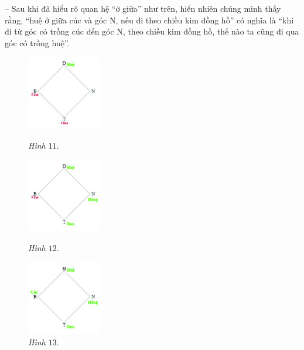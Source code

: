 	-- Sau khi đã hiểu rõ quan hệ “ở giữa” như trên, hiển nhiên chúng mình thấy rằng, “huệ ở giữa cúc và góc N, nếu đi theo chiều kim đồng hồ” có nghĩa là “khi đi từ góc có trồng cúc đến góc N, theo chiều kim đồng hồ, thế nào ta cũng đi qua góc có trồng huệ”. 
	\vskip 0.1cm
	\begin{figure}
		\vspace*{-25pt}
		\centering
		\captionsetup{labelformat=empty, justification=centering}
		\hspace*{-7pt}\includegraphics[width= 0.29\textwidth]{pic11}
		
		\vspace*{-5pt}
		\caption{\textit{\small Hình $11.$}}
		\hspace*{-7pt}\includegraphics[width= 0.29\textwidth]{pic12}
		
		\vspace*{-10pt}
		\caption{\textit{\small Hình $12.$}}
		\vspace*{-25pt}
		
		\hspace*{-7pt}\includegraphics[width= 0.29\textwidth]{pic13}
		
		\vspace*{-15pt}
		\caption{\textit{\small Hình $13.$}}
		\vspace*{-25pt}
	\end{figure}
